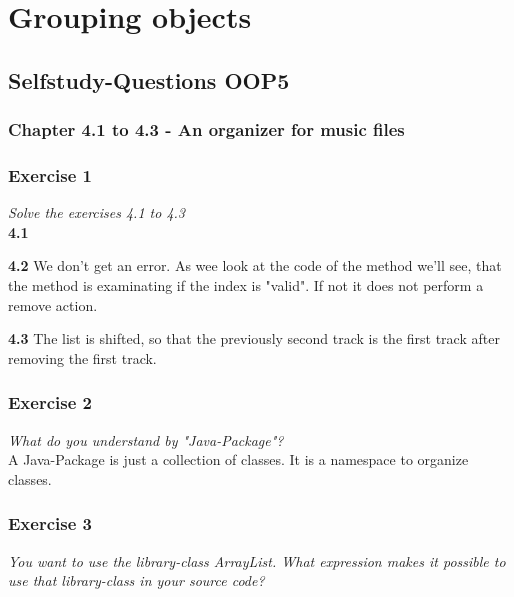\section{Grouping objects}


\subsection{Selfstudy-Questions OOP5}

\subsubsection{Chapter 4.1 to 4.3 - An organizer for music files}

\subsubsection*{Exercise 1}
\textit{Solve the exercises 4.1 to 4.3}\\

\textbf{4.1}




\textbf{4.2} We don't get an error. As wee look at the code of the method
we'll see, that the method is examinating if the index is "valid". If not
it does not perform a remove action.



\textbf{4.3} The list is shifted, so that the previously second track is the
first track after removing the first track.

\subsubsection*{Exercise 2}
\textit{What do you understand by "Java-Package"?}\\

A Java-Package is just a collection of classes. It is a namespace to organize
classes.

\subsubsection*{Exercise 3}
\textit{You want to use the library-class ArrayList. What expression makes it
possible to use that library-class in your source code?}\\

